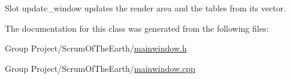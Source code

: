 Slot update\+\_\+window updates the render area and the tables from its vector. 



The documentation for this class was generated from the following files\+:\begin{DoxyCompactItemize}
\item 
Group Project/\+Scrum\+Of\+The\+Earth/\hyperlink{mainwindow_8h}{mainwindow.\+h}\item 
Group Project/\+Scrum\+Of\+The\+Earth/\hyperlink{mainwindow_8cpp}{mainwindow.\+cpp}\end{DoxyCompactItemize}
